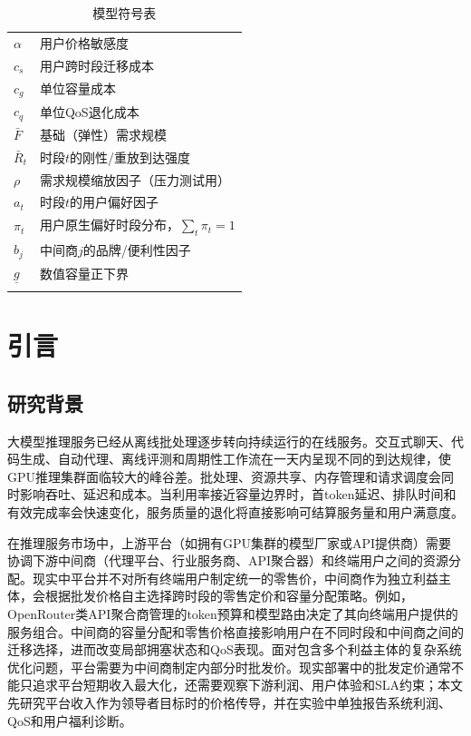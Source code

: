 \documentclass[UTF8,11pt]{ctexart}
\begin{document}
\begin{longtable}{@{}p{}p{}@{}}
$\alpha$ & 用户价格敏感度 \\
$c_s$ & 用户跨时段迁移成本 \\
$c_g$ & 单位容量成本 \\
$c_q$ & 单位QoS退化成本 \\
$\bar F$ & 基础（弹性）需求规模 \\
$\bar R_t$ & 时段$t$的刚性/重放到达强度 \\
$\rho$ & 需求规模缩放因子（压力测试用） \\
$a_t$ & 时段$t$的用户偏好因子 \\
$\pi_t$ & 用户原生偏好时段分布，$\sum_t\pi_t=1$ \\
$b_j$ & 中间商$j$的品牌/便利性因子 \\
$\underline g$ & 数值容量正下界 \\
\bottomrule
\caption{模型符号表}
\label{tab:nomenclature}
\end{longtable}

\section{引言}

\subsection{研究背景}

大模型推理服务已经从离线批处理逐步转向持续运行的在线服务。交互式聊天、代码生成、自动代理、离线评测和周期性工作流在一天内呈现不同的到达规律，使GPU推理集群面临较大的峰谷差。批处理、资源共享、内存管理和请求调度会同时影响吞吐、延迟和成本\cite{crankshaw2017clipper,gujarati2020clockwork,romero2021infaas,yu2022orca,kwon2023pagedattention,agrawal2024sarathiserve}。当利用率接近容量边界时，首token延迟、排队时间和有效完成率会快速变化，服务质量的退化将直接影响可结算服务量和用户满意度。

在推理服务市场中，上游平台（如拥有GPU集群的模型厂家或API提供商）需要协调下游中间商（代理平台、行业服务商、API聚合器）和终端用户之间的资源分配。现实中平台并不对所有终端用户制定统一的零售价，中间商作为独立利益主体，会根据批发价格自主选择跨时段的零售定价和容量分配策略。例如，OpenRouter类API聚合商管理的token预算和模型路由决定了其向终端用户提供的服务组合。中间商的容量分配和零售价格直接影响用户在不同时段和中间商之间的迁移选择，进而改变局部拥塞状态和QoS表现。面对包含多个利益主体的复杂系统优化问题，平台需要为中间商制定内部分时批发价。现实部署中的批发定价通常不能只追求平台短期收入最大化，还需要观察下游利润、用户体验和SLA约束；本文先研究平台收入作为领导者目标时的价格传导，并在实验中单独报告系统利润、QoS和用户福利诊断。
\end{document}
